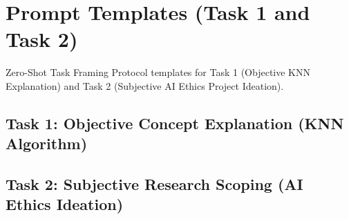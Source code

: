 
\chapter{Prompt Templates (Task 1 and Task 2)}
Zero-Shot Task Framing Protocol templates for Task 1 (Objective KNN Explanation) and Task 2 (Subjective AI Ethics Project Ideation).

\section{Task 1: Objective Concept Explanation (KNN Algorithm)}

\section{Task 2: Subjective Research Scoping (AI Ethics Ideation)}
